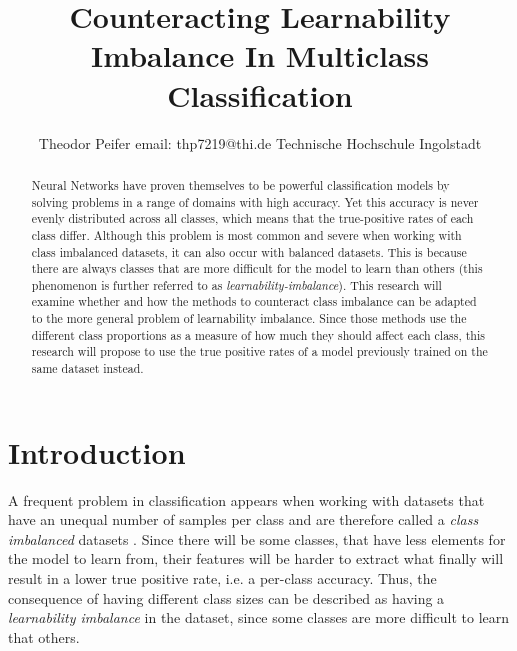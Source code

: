 \documentclass[journal]{IEEEtran}
\begin{document}
 

\title{\textbf{Counteracting Learnability Imbalance In Multiclass Classification}}

\author{Theodor Peifer
        \linebreak
        email: thp7219@thi.de
        \linebreak
        Technische Hochschule Ingolstadt
}

\maketitle

\begin{abstract}
Neural Networks have proven themselves to be powerful classification
models by solving problems in a range of domains with high accuracy.
Yet this accuracy is never evenly distributed across all classes, which means that the true-positive rates of each class differ.
Although this problem is most common and severe when working with class imbalanced datasets, it can also occur with balanced datasets.
This is because there are always classes that are more difficult for the model to learn than others (this phenomenon is further referred to as \emph{learnability-imbalance}).
This research will examine whether and how the methods to counteract class imbalance can be adapted to the more general problem of learnability imbalance.
Since those methods use the different class proportions as a measure of how much they should affect each class, this research will propose
to use the true positive rates of a model previously trained on the same dataset instead.

\end{abstract}


\section{Introduction}
A frequent problem in classification appears when working with datasets that have an unequal number of samples per class and are therefore called a \emph{class imbalanced} datasets \cite{japkowicz2002class}.
Since there will be some classes, that have less elements for the model to learn from, their features will be harder to extract what finally will result in a lower true positive rate, i.e. a per-class accuracy.
Thus, the consequence of having different class sizes can be described as having a \emph{learnability imbalance} in the dataset, since some classes are more difficult to learn that others.
\end{document}
